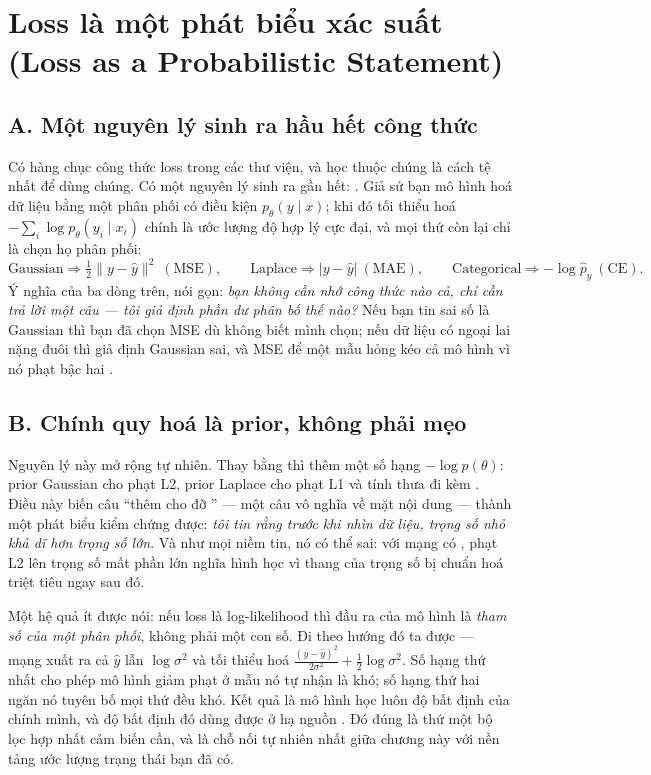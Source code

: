 \documentclass[../../deep_learning.tex]{subfiles}
\begin{document}
\section{Loss là một phát biểu xác suất (Loss as a Probabilistic Statement)}

\subsection{A. Một nguyên lý sinh ra hầu hết công thức}

Có hàng chục công thức loss trong các thư viện, và học thuộc chúng là cách tệ nhất để dùng chúng. Có một nguyên lý sinh ra gần hết: . Giả sử bạn mô hình hoá dữ liệu bằng một phân phối có điều kiện \(p_\theta(y\mid x)\); khi đó tối thiểu hoá \(-\sum_i \log p_\theta(y_i \mid x_i)\) chính là ước lượng độ hợp lý cực đại, và mọi thứ còn lại chỉ là chọn họ phân phối:
\[
\text{Gaussian} \Rightarrow \tfrac12\|y-\hat y\|^2 \ (\text{MSE}), \qquad
\text{Laplace} \Rightarrow |y-\hat y| \ (\text{MAE}), \qquad
\text{Categorical} \Rightarrow -\log \hat p_{y} \ (\text{CE}).
\]
Ý nghĩa của ba dòng trên, nói gọn: \emph{bạn không cần nhớ công thức nào cả, chỉ cần trả lời một câu --- tôi giả định phần dư phân bố thế nào?} Nếu bạn tin sai số là Gaussian thì bạn đã chọn MSE dù không biết mình chọn; nếu dữ liệu có ngoại lai nặng đuôi thì giả định Gaussian sai, và MSE để một mẫu hỏng kéo cả mô hình vì nó phạt bậc hai \cite{murphy2022}.

\subsection{B. Chính quy hoá là prior, không phải mẹo}

Nguyên lý này mở rộng tự nhiên. Thay  bằng  thì thêm một số hạng \(-\log p(\theta)\): prior Gaussian cho phạt L2, prior Laplace cho phạt L1 và tính thưa đi kèm \cite{bishop2006}. Điều này biến câu ``thêm  cho đỡ '' --- một câu vô nghĩa về mặt nội dung --- thành một phát biểu kiểm chứng được: \emph{tôi tin rằng trước khi nhìn dữ liệu, trọng số nhỏ khả dĩ hơn trọng số lớn}. Và như mọi niềm tin, nó có thể sai: với mạng có , phạt L2 lên trọng số mất phần lớn nghĩa hình học vì thang của trọng số bị chuẩn hoá triệt tiêu ngay sau đó.

Một hệ quả ít được nói: nếu loss là log-likelihood thì đầu ra của mô hình là \emph{tham số của một phân phối}, không phải một con số. Đi theo hướng đó ta được  --- mạng xuất ra cả \(\hat y\) lẫn \(\log\sigma^2\) và tối thiểu hoá \(\frac{(y-\hat y)^2}{2\sigma^2} + \frac12\log\sigma^2\). Số hạng thứ nhất cho phép mô hình giảm phạt ở mẫu nó tự nhận là khó; số hạng thứ hai ngăn nó tuyên bố mọi thứ đều khó. Kết quả là mô hình học luôn độ bất định của chính mình, và độ bất định đó dùng được ở hạ nguồn \cite{kendall2018multitask}. Đó đúng là thứ một bộ lọc hợp nhất cảm biến cần, và là chỗ nối tự nhiên nhất giữa chương này với nền tảng ước lượng trạng thái bạn đã có.
\end{document}
